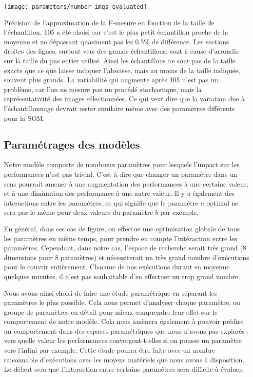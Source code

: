 	\begin{figureth}
		\texttt{[image: parameters/number\_imgs\_evaluated]}
		\caption[Échantillonnage de l'évaluation]{Précision de l'approximation de la F-mesure en fonction de la taille de l'échantillon. 105 a été choisi car c'est le plus petit échantillon proche de la moyenne et ne dépassant quasiment pas les 0.5\% de différence. Les sections droites des lignes, surtout vers des grands échantillons, sont à cause d'arrondis sur la taille du pas entier utilisé. Ainsi les échantillons ne sont pas de la taille exacte que ce que laisse indiquer l'abscisse, mais au moins de la taille indiquée, souvent plus grands. La variabilité qui augmente après 105 n'est pas un problème, car l'on ne mesure pas un procédé stochastique, mais la représentativité des images sélectionnées. Ce qui veut dire que la variation due à l'échantillonnage devrait rester similaire même avec des paramètres différents pour la SOM.}\label{fig:params:nbimgs}
	\end{figureth}

	\subsection{Paramétrages des modèles}

	Notre modèle comporte de nombreux paramètres pour lesquels l'impact sur les performances n'est pas trivial. C'est à dire que changer un paramètre dans un sens pourrait amener à une augmentation des performances à une certaine valeur, et à une diminution des performance à une autre valeur. Il y a également des interactions entre les paramètres, ce qui signifie que le paramètre $a$ optimal ne sera pas le même pour deux valeurs du paramètre $b$ par exemple. 

	En général, dans ces cas de figure, on effectue une optimisation globale de tous les paramètres en même temps, pour prendre en compte l'intéraction entre les paramètres. Cependant, dans notre cas, l'espace de recherche serait très grand (8 dimensions pour 8 paramètres) et nécessiterait un très grand nombre d'exécutions pour le couvrir entièrement. Chacune de nos exécutions durant en moyenne quelques minutes, il n'est pas souhaitable d'en effectuer un trop grand nombre.

	Nous avons ainsi choisi de faire une étude paramétrique en séparant les paramètres le plus possible. Cela nous permet d'analyser chaque paramètre, ou groupe de paramètres en détail pour mieux comprendre leur effet sur le comportement de notre modèle. Cela nous amènera également à pouvoir prédire un comportement dans des espaces paramétriques que nous n'avons pas explorés ; vers quelle valeur les performances convergent-t-elles si on pousse un paramètre vers l'infini par exemple. Cette étude pourra être faite avec un nombre raisonnable d'exécutions avec les moyens matériels que nous avons à disposition. Le défaut sera que l'interaction entre certains paramètres sera difficile à évaluer.

